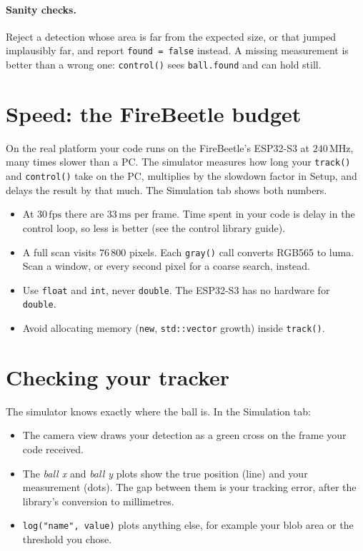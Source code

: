 \documentclass[10pt,a4paper]{article}
\newcommand{\un}[1]{\,\mathrm{#1}}
\begin{document}
\paragraph{Sanity checks.} Reject a detection whose area is far from the expected size, or that
jumped implausibly far, and report \texttt{found = false} instead. A missing measurement is
better than a wrong one: \texttt{control()} sees \texttt{ball.found} and can hold still.

\section{Speed: the FireBeetle budget}
On the real platform your code runs on the FireBeetle's ESP32-S3 at $240\un{MHz}$, many times
slower than a PC. The simulator measures how long your \texttt{track()} and \texttt{control()}
take on the PC, multiplies by the slowdown factor in Setup, and delays the result by that much.
The Simulation tab shows both numbers.
\begin{itemize}
  \item At $30\un{fps}$ there are $33\un{ms}$ per frame. Time spent in your code is delay in the
        control loop, so less is better (see the control library guide).
  \item A full scan visits $76\,800$ pixels. Each \texttt{gray()} call converts RGB565 to luma.
        Scan a window, or every second pixel for a coarse search, instead.
  \item Use \texttt{float} and \texttt{int}, never \texttt{double}. The ESP32-S3 has no hardware
        for \texttt{double}.
  \item Avoid allocating memory (\texttt{new}, \texttt{std::vector} growth) inside
        \texttt{track()}.
\end{itemize}

\section{Checking your tracker}
The simulator knows exactly where the ball is. In the Simulation tab:
\begin{itemize}
  \item The camera view draws your detection as a green cross on the frame your code received.
  \item The \emph{ball x} and \emph{ball y} plots show the true position (line) and your
        measurement (dots). The gap between them is your tracking error, after the library's
        conversion to millimetres.
  \item \texttt{log("name", value)} plots anything else, for example your blob area or the
        threshold you chose.
\end{itemize}
\end{document}

